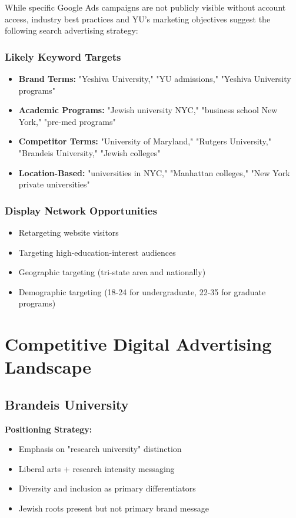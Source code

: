 \documentclass[12pt,letterpaper]{article}
\begin{document}
While specific Google Ads campaigns are not publicly visible without account access, industry best practices and YU's marketing objectives suggest the following search advertising strategy:

\subsubsection{Likely Keyword Targets}
\begin{itemize}[leftmargin=*]
    \item \textbf{Brand Terms:} "Yeshiva University," "YU admissions," "Yeshiva University programs"
    \item \textbf{Academic Programs:} "Jewish university NYC," "business school New York," "pre-med programs"
    \item \textbf{Competitor Terms:} "University of Maryland," "Rutgers University," "Brandeis University," "Jewish colleges"
    \item \textbf{Location-Based:} "universities in NYC," "Manhattan colleges," "New York private universities"
\end{itemize}

\subsubsection{Display Network Opportunities}
\begin{itemize}[leftmargin=*]
    \item Retargeting website visitors
    \item Targeting high-education-interest audiences
    \item Geographic targeting (tri-state area and nationally)
    \item Demographic targeting (18-24 for undergraduate, 22-35 for graduate programs)
\end{itemize}

\section{Competitive Digital Advertising Landscape}

\subsection{Brandeis University}

\textbf{Positioning Strategy:}
\begin{itemize}[leftmargin=*]
    \item Emphasis on "research university" distinction
    \item Liberal arts + research intensity messaging
    \item Diversity and inclusion as primary differentiators
    \item Jewish roots present but not primary brand message
\end{itemize}
\end{document}
